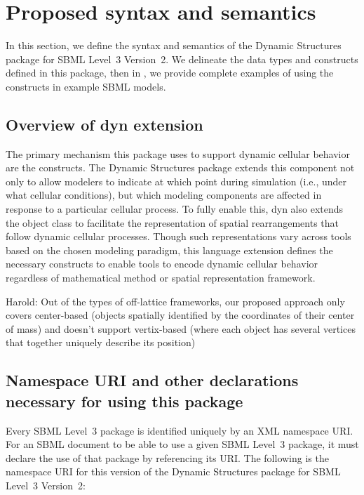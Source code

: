 
\section{Proposed syntax and semantics}
\label{sec:syntax}

In this section, we define the syntax and semantics of the Dynamic Structures package for SBML Level~3 Version~2. We delineate the data types and constructs defined in this package, then in , we provide complete examples of using the constructs in example SBML models.

\subsection{Overview of dyn extension}
\label{subsec:overview}

The primary mechanism this package uses to support dynamic cellular behavior are the \Event constructs. The Dynamic Structures package extends this component not only to allow modelers to indicate at which point during simulation (i.e., under what cellular conditions), but which modeling components are affected in response to a particular cellular process. To fully enable this, dyn also extends the \Compartment object class to facilitate the representation of spatial rearrangements that follow dynamic cellular processes. Though such representations vary across tools based on the chosen modeling paradigm, this language extension defines the necessary constructs to enable tools to encode dynamic cellular behavior regardless of mathematical method or spatial representation framework.

{\color{red} Harold: \notice Out of the types of off-lattice frameworks, our proposed approach only covers center-based (objects spatially identified by the coordinates of their center of mass) and doesn't support vertix-based (where each object has several vertices that together uniquely describe its position)}

\subsection{Namespace URI and other declarations necessary for using this package}
\label{subsec:xml-namespace}

Every SBML Level~3 package is identified uniquely by an XML namespace URI.
For an SBML document to be able to use a given SBML Level~3 package, it
must declare the use of that package by referencing its URI.  The following
is the namespace URI for this version of the Dynamic Structures
package for SBML Level~3 Version~2:

